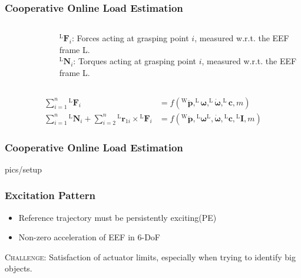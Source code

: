 \documentclass[student,noshadow]{ITRslides}
\renewcommand{\vec}[1]{\boldsymbol{#1}}
\renewcommand{\vec}[1]{\boldsymbol{#1}}
\newcommand{\scr}[1]{\mathrm{#1}}
\begin{document}
\begin{frame}
	\frametitle{Cooperative Online Load Estimation}
	\begin{columns}
			\begin{column}{0.5\textwidth}
				\begin{figure}
					\centering
					
				\end{figure}	
		 	\end{column}
		 	\begin{column}{0.5\textwidth}
		 	$^\scr{L}\vec{F}_i$: Forces acting at grasping point $i$, measured w.r.t. the EEF frame L.\\ \vspace{0.3cm}
		 	$^\scr{L}\vec{N}_i$: Torques acting at grasping point $i$, measured w.r.t. the EEF frame L.\\
		 	\end{column}
	\end{columns}

\begin{align*} 
\sum_{i = 1}^{n}  {^\scr{L}}\vec{F}_{i} &=  f\left(^\scr{W}\vec{\ddot{p}},^\scr{L}\vec{\omega},^\scr{L}\vec{\dot{\omega}},^\scr{L}\vec{c},m\right) \\ 
\sum_{i = 1}^n {^\scr{L}}\vec{N}_{i} + \sum_{i = 2}^n {^\scr{L}}\vec{r}_{1i} \times {^\scr{L}}\vec{F}_{i} &= f\left({^\scr{W}}\vec{\ddot{p}},{^\scr{L}}\vec{\omega}{^\scr{L}},\vec{\dot{\omega}},{^\scr{L}}\vec{c},{^\scr{L}}\vec{I},m\right)
\end{align*}
\end{frame}

\begin{frame}
	\frametitle{Cooperative Online Load Estimation}
	\begin{overpic}[width=0.6\textwidth]{pics/setup}
	\end{overpic}
\end{frame}

\begin{frame}
	\frametitle{Excitation Pattern}
	\vspace{1cm}	
	\begin{itemize}
		\item Reference trajectory must be persistently exciting(PE)
		\item Non-zero acceleration of EEF in 6-DoF \cite{literaturstelle3}
	\end{itemize}
	\vspace{1cm}
	\textsc{Challenge}: Satisfaction of actuator limits, especially when trying to identify big objects.
\end{frame}
\end{document}
